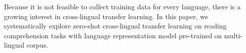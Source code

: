 Because it is not feasible to collect training data for every language, there is a growing interest in cross-lingual transfer learning.
In this paper, we systematically explore zero-shot cross-lingual transfer learning on reading comprehension tasks with language representation model pre-trained on multi-lingual corpus.